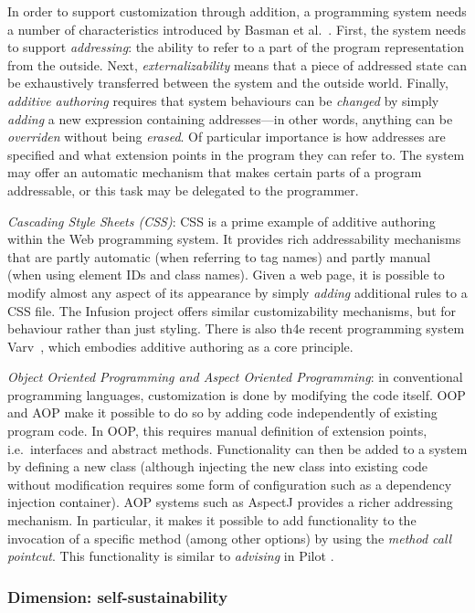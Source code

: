 In order to support customization through addition, a programming system
needs a number of characteristics introduced by Basman et
al.~\cite{Externalize,OpenAuthorial}. First, the system needs to support
\emph{addressing}: the ability to refer to a part of the program
representation from the outside. Next, \emph{externalizability} means
that a piece of addressed state can be exhaustively transferred between
the system and the outside world. Finally, \emph{additive authoring}
requires that system behaviours can be \emph{changed} by simply
\emph{adding} a new expression containing addresses---in other words,
anything can be \emph{overriden} without being \emph{erased}. Of
particular importance is how addresses are specified and what extension
points in the program they can refer to. The system may offer an
automatic mechanism that makes certain parts of a program addressable,
or this task may be delegated to the programmer.

\emph{Cascading Style Sheets (CSS)}: CSS is a prime example of additive
authoring within the Web programming system. It provides rich
addressability mechanisms that are partly automatic (when referring to
tag names) and partly manual (when using element IDs and class names).
Given a web page, it is possible to modify almost any aspect of its
appearance by simply \emph{adding} additional rules to a CSS file. The
Infusion project \cite{Infusion} offers similar customizability
mechanisms, but for behaviour rather than just styling. There is also
th4e recent programming system Varv~\cite{varv}, which embodies additive
authoring as a core principle.

\emph{Object Oriented Programming and Aspect Oriented Programming}: in
conventional programming languages, customization is done by modifying
the code itself. OOP and AOP make it possible to do so by adding code
independently of existing program code. In OOP, this requires manual
definition of extension points, i.e.~interfaces and abstract methods.
Functionality can then be added to a system by defining a new class
(although injecting the new class into existing code without
modification requires some form of configuration such as a dependency
injection container). AOP systems such as AspectJ \cite{AspectJ}
provides a richer addressing mechanism. In particular, it makes it
possible to add functionality to the invocation of a specific method
(among other options) by using the \emph{method call pointcut}. This
functionality is similar to \emph{advising} in Pilot \cite{Pilot}.

\hypertarget{dimension-self-sustainability}{%
\subsubsection{Dimension:
self-sustainability}\label{dimension-self-sustainability}}

